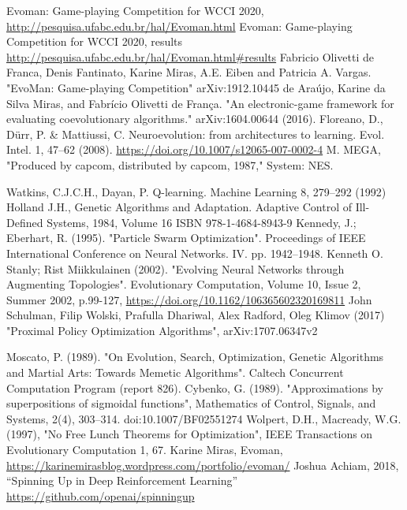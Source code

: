 \documentclass[boxes]{beamer}
\begin{document}

\begin{thebibliography}{17}

     Evoman: Game-playing Competition for WCCI 2020, \url{http://pesquisa.ufabc.edu.br/hal/Evoman.html}
     Evoman: Game-playing Competition for WCCI 2020, results \url{http://pesquisa.ufabc.edu.br/hal/Evoman.html#results}
     Fabricio Olivetti de Franca, Denis Fantinato, Karine Miras, A.E. Eiben and Patricia A. Vargas.
      "EvoMan: Game-playing Competition" arXiv:1912.10445
     de Araújo, Karine da Silva Miras, and Fabrício Olivetti de França.
      "An electronic-game framework for evaluating coevolutionary algorithms." arXiv:1604.00644 (2016).
     Floreano, D., Dürr, P. \& Mattiussi, C. Neuroevolution: from architectures to learning. Evol. Intel. 1, 47–62 (2008). \url{https://doi.org/10.1007/s12065-007-0002-4}
     M. MEGA, "Produced by capcom, distributed by capcom, 1987," System: NES.

      \pagebreak
      
     Watkins, C.J.C.H., Dayan, P. Q-learning. Machine Learning 8, 279–292 (1992)
     Holland J.H., Genetic Algorithms and Adaptation. Adaptive Control of Ill-Defined Systems, 1984, Volume 16 ISBN 978-1-4684-8943-9
     Kennedy, J.; Eberhart, R. (1995). "Particle Swarm Optimization". Proceedings of IEEE International Conference on Neural Networks. IV. pp. 1942–1948.
     Kenneth O. Stanly; Rist Miikkulainen (2002). "Evolving Neural Networks through Augmenting Topologies". Evolutionary Computation, Volume 10, Issue 2, Summer 2002, p.99-127, \url{https://doi.org/10.1162/106365602320169811}
     John Schulman, Filip Wolski, Prafulla Dhariwal, Alex Radford, Oleg Klimov (2017) "Proximal Policy Optimization Algorithms", arXiv:1707.06347v2

      \pagebreak
      
     Moscato, P. (1989). "On Evolution, Search, Optimization, Genetic Algorithms and Martial Arts: Towards Memetic Algorithms". Caltech Concurrent Computation Program (report 826).
     Cybenko, G. (1989). "Approximations by superpositions of sigmoidal functions", Mathematics of Control, Signals, and Systems, 2(4), 303–314. doi:10.1007/BF02551274
     Wolpert, D.H., Macready, W.G. (1997), "No Free Lunch Theorems for Optimization", IEEE Transactions on Evolutionary Computation 1, 67.
     Karine Miras, Evoman, \url{https://karinemirasblog.wordpress.com/portfolio/evoman/}
     Joshua Achiam, 2018, ``Spinning Up in Deep Reinforcement Learning'' \url{https://github.com/openai/spinningup}
  
\end{thebibliography}



\end{document}
